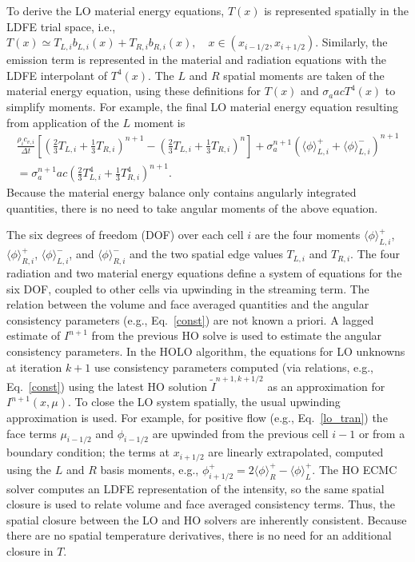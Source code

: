 \documentclass{mc2013}
\newcommand{\mom}[1]{\langle #1 \rangle}
\newcommand{\ir}{{i+1/2}}
\begin{document}
To derive the LO material energy equations, $T(x)$ is represented spatially in
the LDFE trial space, i.e.,
$ T(x) \simeq T_{L,i} b_{L,i}(x) + T_{R,i} b_{R,i}(x),\quad x\in(x_{i-1/2},x_\ir)$.
Similarly, the emission term is represented in the material and radiation equations with the LDFE
interpolant of $T^4(x)$.   The $L$ and $R$ spatial moments are taken of the material
energy equation, using these definitions for $T(x)$ and $\sigma_a a c T^4(x)$ to simplify moments. For example, the final LO material energy
 equation resulting from application of the $L$ moment is
 \begin{multline}\label{lo_mat_dis}
     \frac{\rho_i c_{v,i}}{\Delta t}\left[ \left(\frac{2}{3}T_{L,i} + \frac{1}{3}T_{R,i}
        \right)^{n+1} - \left(\frac{2}{3}T_{L,i} + \frac{1}{3}T_{R,i}
    \right)^{n} \right]  + \sigma_a^{n+1} \left( \mom{\phi}_{L,i}^+ +
    \mom{\phi}_{L,i}^- \right)^{n+1} \\ = \sigma_a^{n+1}a c
\left( \frac{2}{3} T_{L,i}^4 + \frac{1}{3}T_{R,i}^4
        \right)^{n+1}.
\end{multline}
Because the material energy balance
 only contains angularly integrated quantities, there is no need to take angular
 moments of the above equation.  

\label{sec:closure}

The six degrees of freedom (DOF) over each cell $i$ are the four moments $\mom{\phi}_{L,i}^+$,
$\mom{\phi}_{R,i}^+$, $\mom{\phi}_{L,i}^-$, and $\mom{\phi}_{R,i}^-$ and the two
spatial edge values $T_{L,i}$ and $T_{R,i}$. The four radiation and two material
energy equations define a system of equations for the six DOF, coupled to other cells
via upwinding in the streaming term.
The relation between the volume and face averaged quantities and the angular consistency parameters (e.g., Eq.~\eqref{const}) are not known a priori. 
A lagged estimate of $I^{n+1}$ from the previous HO solve is
used to estimate the angular consistency parameters. In the HOLO algorithm, the equations for LO unknowns at iteration $k+1$ use consistency parameters
computed (via relations, e.g., Eq.~\eqref{const}) using the latest HO solution $\tilde{I}^{n+1,k+1/2}$
as an approximation for $I^{n+1}(x,\mu)$. To close the LO system spatially, the usual upwinding
approximation is used.  For example, for positive flow (e.g., Eq.~\eqref{lo_tran}) the face terms $\mu_{i-1/2}$ and $\phi_{i-1/2}$
are upwinded from the previous cell $i-1$ or from a boundary condition; the terms
at $x_{i+1/2}$ are linearly extrapolated, computed using the $L$ and $R$ basis
moments, e.g., $\phi^+_{i+1/2} = 2\mom{\phi}_R^+ - \mom{\phi}_L^+$. 
The HO ECMC solver computes an LDFE representation of the intensity, so the same spatial closure is used to relate volume and face averaged consistency terms.  Thus, the spatial closure between the LO and HO solvers are inherently
consistent.  Because there are no
spatial temperature derivatives, there is no need for an
additional closure in $T$. 
\end{document}
